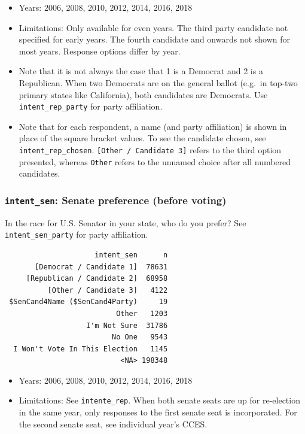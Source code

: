 \documentclass[10pt,article,oneside]{memoir}
\theoremstyle{definition}
\begin{document}
\begin{itemize}
\tightlist
\item
  Years: 2006, 2008, 2010, 2012, 2014, 2016, 2018
\item
  Limitations: Only available for even years. The third party candidate
  not specified for early years. The fourth candidate and onwards not
  shown for most years. Response options differ by year.
\item
  Note that it is not always the case that 1 is a Democrat and 2 is a
  Republican. When two Democrats are on the general ballot (e.g.~in
  top-two primary states like California), both candidates are
  Democrats. Use \texttt{intent\_rep\_party} for party affiliation.
\item
  Note that for each respondent, a name (and party affiliation) is shown
  in place of the square bracket values. To see the candidate chosen,
  see \texttt{intent\_rep\_chosen}.
  \texttt{{[}Other\ /\ Candidate\ 3{]}} refers to the third option
  presented, whereas \texttt{Other} refers to the unnamed choice after
  all numbered candidates.
\end{itemize}

\hypertarget{intent_sen-senate-preference-before-voting}{%
\subsubsection{\texorpdfstring{\texttt{intent\_sen}: Senate preference
(before
voting)}{intent\_sen: Senate preference (before voting)}}\label{intent_sen-senate-preference-before-voting}}

In the race for U.S. Senator in your state, who do you prefer? See
\texttt{intent\_sen\_party} for party affiliation.

\begin{verbatim}
                     intent_sen      n
       [Democrat / Candidate 1]  78631
     [Republican / Candidate 2]  68958
          [Other / Candidate 3]   4122
 $SenCand4Name ($SenCand4Party)     19
                          Other   1203
                   I'm Not Sure  31786
                         No One   9543
  I Won't Vote In This Election   1145
                           <NA> 198348
\end{verbatim}

\begin{itemize}
\tightlist
\item
  Years: 2006, 2008, 2010, 2012, 2014, 2016, 2018
\item
  Limitations: See \texttt{intente\_rep}. When both senate seats are up
  for re-election in the same year, only responses to the first senate
  seat is incorporated. For the second senate seat, see individual
  year's CCES.
\end{itemize}
\end{document}
